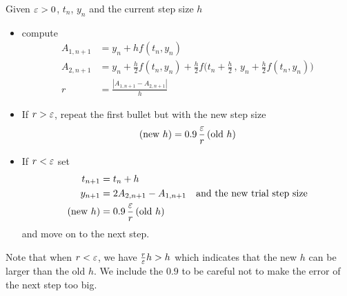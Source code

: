 \begin{impeqn}\label{full E E2}
Given $\varepsilon>0$, $t_n$, $y_n$ and the current step size $h$
\begin{itemize}
\item compute
\begin{align*}
A_{1,n+1}&=y_n+hf(t_n,y_n) \\
A_{2,n+1} &= y_n+\tfrac{h}{2}f(t_n,y_n)
    +\tfrac{h}{2}f\big(t_n+\tfrac{h}{2}\,,\,y_n+\tfrac{h}{2}f(t_n,y_n)\big)\\
r&=\frac{|A_{1,n+1}-A_{2,n+1}|}{h}
\end{align*}

\item
If $r>\varepsilon$, repeat the first bullet but with the new step size
\begin{equation*}
(\text{new }h)=0.9\,\frac{\varepsilon}{r}\,(\text{old }h)
\end{equation*}

\item
If $r<\varepsilon$ set
\begin{align*}
t_{n+1}&=t_n+h \\
y_{n+1}&=2A_{2,n+1}-A_{1,n+1}\quad\text{and the new trial step size} \\
(\text{new } h)&=0.9\,\frac{\varepsilon}{r}\,(\text{old }h)
\end{align*}
and move on to the next step. 
\end{itemize}
\end{impeqn}\noindent
Note that when $r<\varepsilon$, we have $\frac{r}{\varepsilon}h> h$ which indicates that the new $h$ can be larger than the old $h$. We include the $0.9$ to be careful not to make the error of the next step too big.

